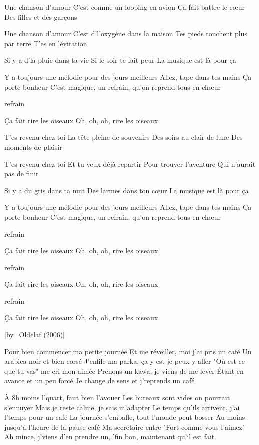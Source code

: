 \beginverse
Une chanson d'amour
C'est comme un looping en avion
Ça fait battre le cœur
Des filles et des garçons
\endverse

\beginverse
Une chanson d'amour
C'est d'l'oxygène dans la maison
Tes pieds touchent plus par terre
T'es en lévitation
\endverse

\beginverse
Si y a d'la pluie dans ta vie
Si le soir te fait peur
La musique est là pour ça
\endverse

\beginverse
Y a toujours une mélodie pour des jours meilleurs
Allez, tape dans tes mains
Ça porte bonheur
C'est magique, un refrain, qu'on reprend tous en chœur
\endverse

	refrain

\beginverse
Ça fait rire les oiseaux
Oh, oh, oh, rire les oiseaux
\endverse

\beginverse
T'es revenu chez toi
La tête pleine de souvenirs
Des soirs au clair de lune
Des moments de plaisir
\endverse

\beginverse
T'es revenu chez toi
Et tu veux déjà repartir
Pour trouver l'aventure
Qui n'aurait pas de finir
\endverse

\beginverse
Si y a du gris dans ta nuit
Des larmes dans ton cœur
La musique est là pour ça
\endverse

\beginverse
Y a toujours une mélodie pour des jours meilleurs
Allez, tape dans tes mains
Ça porte bonheur
C'est magique, un refrain, qu'on reprend tous en chœur
\endverse

	refrain

\beginverse
Ça fait rire les oiseaux
Oh, oh, oh, rire les oiseaux
\endverse

	refrain

\beginverse
Ça fait rire les oiseaux
Oh, oh, oh, rire les oiseaux
\endverse

	refrain

\beginverse
Ça fait rire les oiseaux
Oh, oh, oh, rire les oiseaux
\\[bis]
\endverse

[by={Oldelaf (2006)}]

\beginverse
Pour bien commencer ma petite journée
Et me réveiller, moi j'ai pris un café
Un arabica noir et bien corsé
J'enfile ma parka, ça y est je peux y aller
"Où est-ce que tu vas" me cri mon aimée
Prenons un kawa, je viens de me lever
Étant en avance et un peu forcé
Je change de sens et j'reprends un café
\endverse

\beginverse
À 8h moins l'quart, faut bien l'avouer
Les bureaux sont vides on pourrait s'ennuyer
Mais je reste calme, je sais m'adapter
Le temps qu'ils arrivent, j'ai l'temps pour un café
La journée s'emballe, tout l'monde peut bosser
Au moins jusqu'à l'heure de la pause café
Ma secrétaire entre "Fort comme vous l'aimez"
Ah mince, j'viens d'en prendre un, 'fin bon, maintenant qu'il est fait
\endverse


